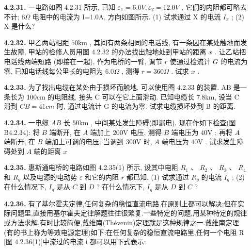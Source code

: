 \vfill
\newpage

\textbf{4.2.31.} 一电路如图 4.2.31 所示, 已知 $\varepsilon_{1}=6.0V, \varepsilon_{2}=12.0V$ , 它们的内阻都可略去不计; $6\Omega$ 电阻中的电流为 I=1.0A, 方向如图所示. (1) 试求通过 X 的电流 $I_{x}$ ; (2) X 是什么?

\vfill
\newpage

\textbf{4.2.32.} 甲乙两站相距 $50\mathrm{km}$ , 其间有两条相同的电话线, 有一条因在某处触地而发生故障, 甲站的检修人员用图 4.2.32 的办法找出触地处到甲站的距离 $x$ . 让乙站把电话线两端短路 (即接在一起), 作为电桥的一臂, 调节 $r$ 使通过检流计 $G$ 的电流为零, 已知电话线每公里长的电阻为 $6.0\Omega$ , 测得 $r = 360\Omega$ . 试求 $x$ .

\begin{center}
\end{center}

\vfill
\newpage

\textbf{4.2.33.} 为了找出电缆在某处由于损坏而触地, 可以使用图 4.2.33 的装置. AB 是一条长为 100cm 的电阻线, 接头 C 可以在它上面滑动. 已知电缆长 7.8km, 设当 C 滑到 $\overline{CB} = 41cm$ 时, 通过电流计 G 的电流为零. 试求电缆损坏处到 B 的距离.

\begin{center}
\end{center}

\vfill
\newpage

\textbf{4.2.34.} 一电缆 $AB$ 长 $50\mathrm{km}$ , 中间某处发生障碍(即漏电). 现在作如下检查(图B4.2.34): 将 $B$ 端断开, 在 $A$ 端加上 $200\mathrm{V}$ 电压, 测得 $B$ 端电压为 $40\mathrm{V}$ ; 再将 $A$ 端断开, 在 $B$ 端加上可调的电压, 当调到 $300\mathrm{V}$ 时, $A$ 端电压为 $40\mathrm{V}$ . 试求发生障碍处到 $A$ 端的距离 $x$

\vfill
\newpage

\textbf{4.2.35.} 惠斯通电桥的电路如图 4.2.35(1) 所示, 设其中电阻 $R_{1}$ 、 $R_{2}$ 、 $R_{3}$ 、 $R_{4}$ 和 $R_{g}$ 以及电源的电动势 $\varepsilon$ 和它的内阻 $r$ 都已知. (1) 试求通过 $R_{g}$ 的电流 $I_{g}$ ; (2) 在什么情况下, $I_{g}$ 是从 $C$ 到 $D$ ? 在什么情况下, $I_{g}$ 是从 $D$ 到 $C$ ?

\begin{center}
\end{center}

\vfill
\newpage

\textbf{4.2.36.} 有了基尔霍夫定律,任何复杂的稳恒直流电路,在原则上都可以解决;但在实际问题里,直接用基尔霍夫定律解题往往很繁复.一些特定的问题,用某种特定的规律或方法求解,有时比较简便,戴维南(Thévenin)定理就是这种规律之一.戴维南定理(有的书上称为等效电源定理)如下:在任何复杂的稳恒直流电路里,任何一个电阻 R [图 4.2.36(1)]中流过的电流 i 都可以用下式表示:


